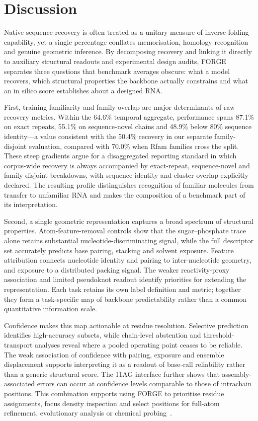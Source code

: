 \section{Discussion}

Native sequence recovery is often treated as a unitary measure of inverse-folding capability, yet a single percentage conflates memorisation, homology recognition and genuine geometric inference. By decomposing recovery and linking it directly to auxiliary structural readouts and experimental design audits, FORGE separates three questions that benchmark averages obscure: what a model recovers, which structural properties the backbone actually constrains and what an in silico score establishes about a designed RNA.

First, training familiarity and family overlap are major determinants of raw recovery metrics. Within the 64.6\% temporal aggregate, performance spans 87.1\% on exact repeats, 55.1\% on sequence-novel chains and 48.9\% below 80\% sequence identity—a value consistent with the 50.4\% recovery in our separate family-disjoint evaluation, compared with 70.0\% when Rfam families cross the split. These steep gradients argue for a disaggregated reporting standard in which corpus-wide recovery is always accompanied by exact-repeat, sequence-novel and family-disjoint breakdowns, with sequence identity and cluster overlap explicitly declared. The resulting profile distinguishes recognition of
familiar molecules from transfer to unfamiliar RNA and makes the composition
of a benchmark part of its interpretation.

Second, a single geometric representation captures a broad spectrum of structural properties. Atom-feature-removal controls show that the sugar--phosphate trace alone retains substantial nucleotide-discriminating signal, while the full descriptor set accurately predicts base pairing, stacking and solvent exposure. Feature attribution connects nucleotide identity and pairing
to inter-nucleotide geometry, and exposure to a distributed packing signal.
The weaker reactivity-proxy association and limited pseudoknot readout
identify priorities for extending the representation. Each task retains its
own label definition and metric; together they form a task-specific map of
backbone predictability rather than a common quantitative information scale.

Confidence makes this map actionable at residue resolution. Selective
prediction identifies high-accuracy subsets, while chain-level abstention
and threshold-transport analyses reveal where a pooled operating point
ceases to be reliable. The weak association of confidence with pairing, exposure and ensemble displacement supports
interpreting it as a readout of base-call reliability rather than a generic
structural score. The 11AG interface further shows that assembly-associated
errors can occur at confidence levels comparable to those of intrachain positions. This
combination supports using FORGE to prioritise residue assignments, focus
density inspection and select positions for full-atom refinement,
evolutionary analysis or chemical probing~\citep{zubradt2017dms}.

